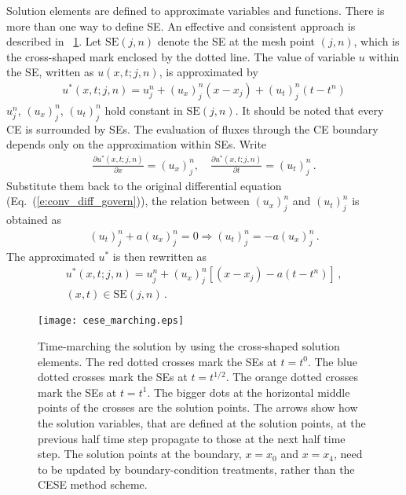 \documentclass{turgon}
\begin{document}
Solution elements are defined to approximate variables and functions.  There is
more than one way to define SE.  An effective and consistent approach is
described in \figurename~\ref{f:cese_marching}.  Let $\mathrm{SE}(j,n)$ denote
the SE at the mesh point $(j,n)$, which is the cross-shaped mark enclosed by
the dotted line.  The value of variable $u$ within the SE, written as
$u(x,t;j,n)$, is approximated by
\begin{align*}
  u^*(x,t;j,n) = u_j^n + (u_x)_j^n(x-x_j) + (u_t)_j^n(t-t^n)
\end{align*}
$u_j^n$, $(u_x)_j^n$, $(u_t)_j^n$ hold constant in $\mathrm{SE}(j,n)$.  It
should be noted that every CE is surrounded by SEs.  The evaluation of fluxes
through the CE boundary depends only on the approximation within SEs.  Write
\begin{align*}
  \frac{\partial u^*(x,t;j,n)}{\partial x} = (u_x)_j^n, \quad
  \frac{\partial u^*(x,t;j,n)}{\partial t} = (u_t)_j^n \,.
\end{align*}
Substitute them back to the original differential equation
(Eq.~(\ref{e:conv_diff_govern})), the relation between $(u_x)_j^n$ and
$(u_t)_j^n$ is obtained as
\begin{align*}
              (u_t)_j^n + a(u_x)_j^n = 0
  \Rightarrow (u_t)_j^n = -a(u_x)_j^n \,.
\end{align*}
The approximated $u^*$ is then rewritten as
\begin{gather*}
  u^*(x,t;j,n) = u_j^n + (u_x)_j^n[(x-x_j) - a(t-t^n)] \,, \\
  (x,t) \in \mathrm{SE}(j,n) \,.
\end{gather*}

\begin{figure}[hbtp]
  \centering
  \texttt{[image: cese\_marching.eps]}
  \caption{Time-marching the solution by using the cross-shaped solution
  elements.  The {\color{red} red} dotted crosses mark the SEs at $t=t^0$.  The
  {\color{blue} blue} dotted crosses mark the SEs at $t=t^{1/2}$.  The
  {\color{orange} orange} dotted crosses mark the SEs at $t=t^1$.  The bigger
  dots at the horizontal middle points of the crosses are the solution points.
  The arrows show how the solution variables, that are defined at the solution
  points, at the previous half time step propagate to those at the next half
  time step.  The solution points at the boundary, $x=x_0$ and $x=x_4$, need to
  be updated by boundary-condition treatments, rather than the CESE method
  scheme.}
  \label{f:cese_marching}
\end{figure}
\end{document}
